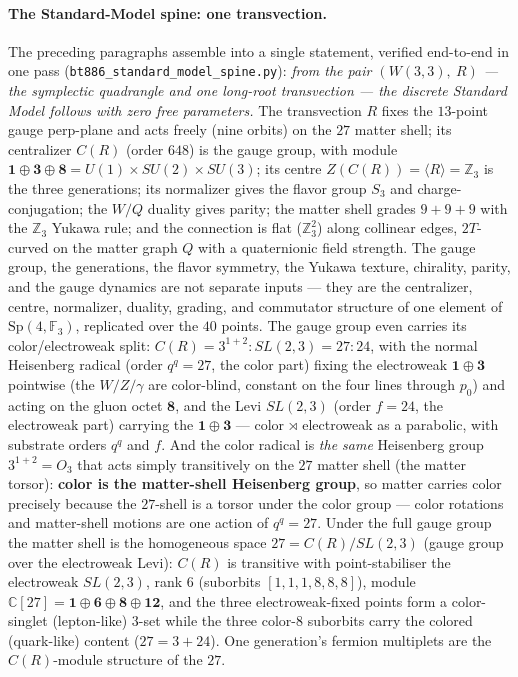 \documentclass[11pt]{article}
\newcommand{\W}{W(3,3)}
\newcommand{\GF}[1]{\mathbb{F}_{#1}}
\newcommand{\Sp}{\mathrm{Sp}}
\begin{document}
\paragraph{The Standard-Model spine: one transvection.}
The preceding paragraphs assemble into a single statement, verified
end-to-end in one pass (\texttt{bt886\_standard\_model\_spine.py}):
\emph{from the pair $(\W,\ R)$ --- the symplectic quadrangle and one
long-root transvection --- the discrete Standard Model follows with
zero free parameters.} The transvection $R$ fixes the $13$-point
gauge perp-plane and acts freely (nine orbits) on the $27$ matter
shell; its centralizer $C(R)$ (order $648$) is the gauge group, with
module $\mathbf{1}\oplus\mathbf{3}\oplus\mathbf{8}=
U(1)\times SU(2)\times SU(3)$; its centre $Z(C(R))=\langle R\rangle
=\mathbb{Z}_3$ is the three generations; its normalizer gives the
flavor group $S_3$ and charge-conjugation; the $W/Q$ duality gives
parity; the matter shell grades $9{+}9{+}9$ with the $\mathbb{Z}_3$
Yukawa rule; and the connection is flat ($\mathbb{Z}_3^2$) along
collinear edges, $2T$-curved on the matter graph $Q$ with a
quaternionic field strength.  The gauge group, the generations, the
flavor symmetry, the Yukawa texture, chirality, parity, and the gauge
dynamics are not separate inputs --- they are the centralizer,
centre, normalizer, duality, grading, and commutator structure of one
element of $\Sp(4,\GF3)$, replicated over the $40$ points.  The gauge
group even carries its color/electroweak split: $C(R)=3^{1+2}:SL(2,3)
=27{:}24$, with the normal Heisenberg radical (order $q^q=27$, the
color part) fixing the electroweak $\mathbf{1}\oplus\mathbf{3}$
pointwise (the $W/Z/\gamma$ are color-blind, constant on the four
lines through $p_0$) and acting on the gluon octet $\mathbf{8}$, and
the Levi $SL(2,3)$ (order $f=24$, the electroweak part) carrying the
$\mathbf{1}\oplus\mathbf{3}$ --- color $\rtimes$ electroweak as a
parabolic, with substrate orders $q^q$ and $f$.  And the color
radical is \emph{the same} Heisenberg group $3^{1+2}=O_3$ that acts
simply transitively on the $27$ matter shell (the matter torsor):
\textbf{color is the matter-shell Heisenberg group}, so matter
carries color precisely because the $27$-shell is a torsor under the
color group --- color rotations and matter-shell motions are one
action of $q^q=27$.  Under the full gauge group the matter shell is
the homogeneous space $27=C(R)/SL(2,3)$ (gauge group over the
electroweak Levi): $C(R)$ is transitive with point-stabiliser the
electroweak $SL(2,3)$, rank $6$ (suborbits $[1,1,1,8,8,8]$), module
$\mathbb{C}[27]=\mathbf{1}\oplus\mathbf{6}\oplus\mathbf{8}\oplus
\mathbf{12}$, and the three electroweak-fixed points form a
color-singlet (lepton-like) $3$-set while the three color-$8$
suborbits carry the colored (quark-like) content
($27=3+24$).  One generation's fermion multiplets are the
$C(R)$-module structure of the $27$.
\end{document}
